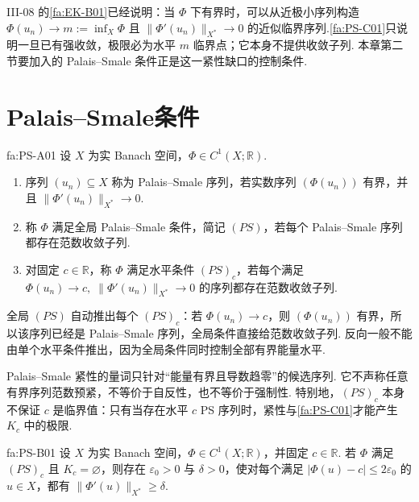 III-08 的\autoref{fa:EK-B01}已经说明：当 \(\displaystyle\Phi\) 下有界时，可以从近极小序列构造 \(\displaystyle\Phi(u_n)\to m:=\inf_X\Phi\) 且 \(\displaystyle\|\Phi'(u_n)\|_{X^*}\to0\) 的近似临界序列.\autoref{fa:PS-C01}只说明一旦已有强收敛，极限必为水平 \(\displaystyle m\) 临界点；它本身不提供收敛子列. 本章第二节要加入的 Palais--Smale 条件正是这一紧性缺口的控制条件.

\section{Palais--Smale条件}\label{sec:iii09-palais-smale}

\begin{FADefinition}{fa:PS-A01}
设 \(\displaystyle X\) 为实 Banach 空间，\(\displaystyle\Phi\in C^1(X;\mathbb R)\).
\begin{enumerate}
\item 序列 \(\displaystyle(u_n)\subseteq X\) 称为 Palais--Smale 序列，若实数序列 \(\displaystyle(\Phi(u_n))\) 有界，并且
\(\displaystyle \|\Phi'(u_n)\|_{X^*}\longrightarrow0\).
\item 称 \(\displaystyle\Phi\) 满足全局 Palais--Smale 条件，简记 \(\displaystyle(PS)\)，若每个 Palais--Smale 序列都存在范数收敛子列.
\item 对固定 \(\displaystyle c\in\mathbb R\)，称 \(\displaystyle\Phi\) 满足水平条件 \(\displaystyle(PS)_c\)，若每个满足
\(\displaystyle \Phi(u_n)\longrightarrow c, \; \|\Phi'(u_n)\|_{X^*}\longrightarrow0\)
的序列都存在范数收敛子列.
\end{enumerate}
\end{FADefinition}

全局 \(\displaystyle(PS)\) 自动推出每个 \(\displaystyle(PS)_c\)：若 \(\displaystyle\Phi(u_n)\to c\)，则 \(\displaystyle(\Phi(u_n))\) 有界，所以该序列已经是 Palais--Smale 序列，全局条件直接给范数收敛子列. 反向一般不能由单个水平条件推出，因为全局条件同时控制全部有界能量水平.

Palais--Smale 紧性的量词只针对“能量有界且导数趋零”的候选序列. 它不声称任意有界序列范数预紧，不等价于自反性，也不等价于强制性. 特别地，\(\displaystyle(PS)_c\) 本身不保证 \(\displaystyle c\) 是临界值：只有当存在水平 \(\displaystyle c\) PS 序列时，紧性与\autoref{fa:PS-C01}才能产生 \(\displaystyle K_c\) 中的极限.

\begin{FAProposition}[B][空临界水平附近的定量梯度下界]{fa:PS-B01}
设 \(\displaystyle X\) 为实 Banach 空间，\(\displaystyle\Phi\in C^1(X;\mathbb R)\)，并固定 \(\displaystyle c\in\mathbb R\). 若 \(\displaystyle\Phi\) 满足 \(\displaystyle(PS)_c\) 且 \(\displaystyle K_c=\varnothing\)，则存在 \(\displaystyle\varepsilon_0>0\) 与 \(\displaystyle\delta>0\)，使对每个满足
\(\displaystyle |\Phi(u)-c|\leqslant2\varepsilon_0\)
的 \(\displaystyle u\in X\)，都有
\(\displaystyle \|\Phi'(u)\|_{X^*}\geqslant\delta\).
\end{FAProposition}

